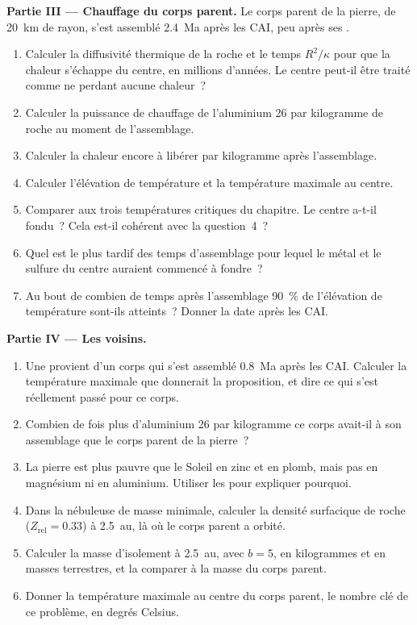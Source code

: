 \begin{problem}
\noindent\textbf{Partie III --- Chauffage du corps parent.}
Le corps parent de la pierre, de \qty{20}{km} de rayon, s'est assemblé \qty{2.4}{Ma} après
les CAI, peu après ses .
\begin{enumerate}[resume]
  \item Calculer la diffusivité thermique de la roche et le temps $R^2/\kappa$ pour
        que la chaleur s'échappe du centre, en millions d'années. Le centre peut-il être
        traité comme ne perdant aucune chaleur~?
  \item Calculer la puissance de chauffage de l'aluminium 26 par kilogramme de roche au moment
        de l'assemblage.
  \item Calculer la chaleur encore à libérer par kilogramme après l'assemblage.
  \item Calculer l'élévation de température et la température maximale au centre.
  \item Comparer aux trois températures critiques du chapitre. Le centre a-t-il fondu~?
        Cela est-il cohérent avec la question~4~?
  \item Quel est le plus tardif des temps d'assemblage pour lequel le métal et le sulfure du
        centre auraient commencé à fondre~?
  \item Au bout de combien de temps après l'assemblage \qty{90}{\percent} de l'élévation
        de température sont-ils atteints~? Donner la date après les CAI.
\end{enumerate}

\noindent\textbf{Partie IV --- Les voisins.}
\begin{enumerate}[resume]
  \item Une  provient d'un corps qui s'est assemblé \qty{0.8}{Ma} après les CAI.
        Calculer la température maximale que donnerait la proposition, et dire ce qui s'est
        réellement passé pour ce corps.
  \item Combien de fois plus d'aluminium 26 par kilogramme ce corps avait-il à son assemblage
        que le corps parent de la pierre~?
  \item La pierre est plus pauvre que le Soleil en zinc et en plomb, mais pas en magnésium
        ni en aluminium. Utiliser les  pour expliquer pourquoi.
  \item Dans la nébuleuse de masse minimale, calculer la densité surfacique de roche
        ($Z_{\mathrm{rel}} = 0.33$) à \qty{2.5}{au}, là où le corps parent
        a orbité.
  \item Calculer la masse d'isolement à \qty{2.5}{au}, avec $b = 5$, en kilogrammes et
        en masses terrestres, et la comparer à la masse du corps parent.
  \item Donner la température maximale au centre du corps parent, le nombre clé de ce
        problème, en degrés Celsius.
\end{enumerate}
\end{problem}
